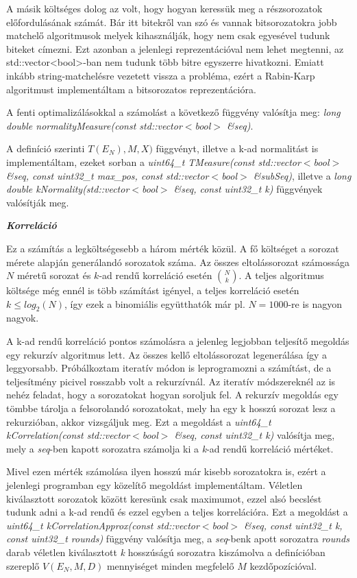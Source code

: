 \documentclass[hidelinks, 12pt]{article}
\begin{document}
A másik költséges dolog az volt, hogy hogyan keressük meg a részsorozatok előfordulásának számát. Bár itt bitekről van szó és vannak bitsorozatokra jobb matchelő algoritmusok melyek kihasználják, hogy nem csak egyesével tudunk biteket címezni. Ezt azonban a jelenlegi reprezentációval nem lehet megtenni, az std::vector<bool>-ban nem tudunk több bitre egyszerre hivatkozni. Emiatt inkább string-matchelésre vezetett vissza a probléma, ezért a Rabin-Karp algoritmust implementáltam a bitsorozatos reprezentációra.

A fenti optimalizálásokkal a számolást a következő függvény valósítja meg: \textit{long double normalityMeasure(const std::vector$<$bool$>$ \&seq)}.

A definíció szerinti $T(E_N), M, X)$ függvényt, illetve a k-ad normalitást is implementáltam, ezeket sorban a \textit{uint64\_t TMeasure(const std::vector$<$bool$>$ \&seq, const uint32\_t max\_pos, const std::vector$<$bool$>$ \&subSeq)}, illetve a \textit{long double kNormality(std::vector$<$bool$>$ \&seq, const uint32\_t k)} függvények valósítják meg.

\textit{\textbf{Korreláció}}

Ez a számítás a legköltségesebb a három mérték közül. A fő költséget a sorozat mérete alapján generálandó sorozatok száma. Az összes eltolássorozat számossága $N$ méretű sorozat és $k$-ad rendű korreláció esetén $\binom{N}{k}$. A teljes algoritmus költsége még ennél is több számítást igényel, a teljes korreláció esetén $k \leq log_2(N)$, így ezek a binomiális együtthatók már pl. $N=1000$-re is nagyon nagyok. 

A k-ad rendű korreláció pontos számolásra a jelenleg legjobban teljesítő megoldás egy rekurzív algoritmus lett. Az összes kellő eltolássorozat legenerálása így a leggyorsabb. Próbálkoztam iteratív módon is leprogramozni a számítást, de a teljesítmény picivel rosszabb volt a rekurzívnál. Az iteratív módszereknél az is nehéz feladat, hogy a sorozatokat hogyan soroljuk fel. A rekurzív megoldás egy tömbbe tárolja a felsorolandó sorozatokat, mely ha egy k hosszú sorozat lesz a rekurzióban, akkor vizsgáljuk meg. Ezt a megoldást a \textit{uint64\_t kCorrelation(const std::vector$<$bool$>$ \&seq, const uint32\_t k)} valósítja meg, mely a \textit{seq}-ben kapott sorozatra számolja ki a \textit{k}-ad rendű korreláció mértéket.

Mivel ezen mérték számolása ilyen hosszú már kisebb sorozatokra is, ezért a jelenlegi programban egy közelítő megoldást implementáltam. Véletlen kiválasztott sorozatok között keresünk csak maximumot, ezzel alsó becslést tudunk adni a k-ad rendű és ezzel egyben a teljes korrelációra. Ezt a megoldást a \textit{uint64\_t kCorrelationApprox(const std::vector$<$bool$>$ \&seq, const uint32\_t k, const uint32\_t rounds)} függvény valósítja meg, a \textit{seq}-benk apott sorozatra \textit{rounds} darab véletlen kiválasztott \textit{k} hosszúságú sorozatra kiszámolva a definícióban szereplő $V(E_N, M, D)$ mennyiséget minden megfelelő $M$ kezdőpozícióval.
\end{document}
